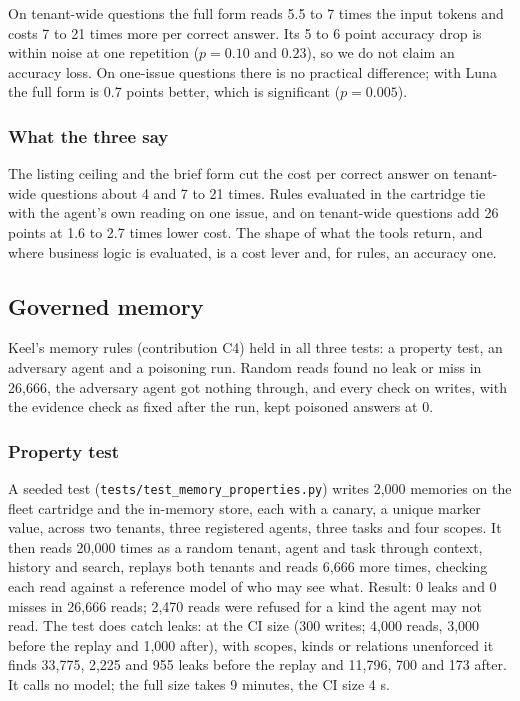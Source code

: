 \documentclass{article}
\newcommand{\code}[1]{\texttt{#1}}
\begin{document}
On tenant-wide questions the full form reads 5.5 to 7 times the input tokens and costs 7 to 21 times more per correct answer. Its 5 to 6 point accuracy drop is within noise at one repetition ($p = 0.10$ and $0.23$), so we do not claim an accuracy loss. On one-issue questions there is no practical difference; with Luna the full form is 0.7 points better, which is significant ($p = 0.005$).

\subsubsection*{What the three say}

The listing ceiling and the brief form cut the cost per correct answer on tenant-wide questions about 4 and 7 to 21 times. Rules evaluated in the cartridge tie with the agent's own reading on one issue, and on tenant-wide questions add 26 points at 1.6 to 2.7 times lower cost. The shape of what the tools return, and where business logic is evaluated, is a cost lever and, for rules, an accuracy one.

\subsection{Governed memory}
\label{sec:governed}

Keel's memory rules (contribution C4) held in all three tests: a property test, an adversary agent and a poisoning run. Random reads found no leak or miss in 26,666, the adversary agent got nothing through, and every check on writes, with the evidence check as fixed after the run, kept poisoned answers at 0.

\subsubsection*{Property test}

A seeded test (\code{tests/test\_memory\_properties.py}) writes 2,000 memories on the fleet cartridge and the in-memory store, each with a canary, a unique marker value, across two tenants, three registered agents, three tasks and four scopes. It then reads 20,000 times as a random tenant, agent and task through context, history and search, replays both tenants and reads 6,666 more times, checking each read against a reference model of who may see what. Result: 0 leaks and 0 misses in 26,666 reads; 2,470 reads were refused for a kind the agent may not read. The test does catch leaks: at the CI size (300 writes; 4,000 reads, 3,000 before the replay and 1,000 after), with scopes, kinds or relations unenforced it finds 33,775, 2,225 and 955 leaks before the replay and 11,796, 700 and 173 after. It calls no model; the full size takes 9 minutes, the CI size 4 s.
\end{document}
